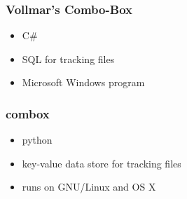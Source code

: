 \begin{frame}
  \frametitle{Vollmar's Combo-Box}

  \begin{itemize}
  \item<1-> C\#
  \item<2-> SQL for tracking files
  \item<3-> Microsoft Windows program
  \end{itemize}

\end{frame}

\begin{frame}
  \frametitle{combox}

  \begin{itemize}
  \item<1-> python
  \item<2-> key-value data store for tracking files
  \item<3-> runs on GNU/Linux and OS X
  \end{itemize}
\end{frame}